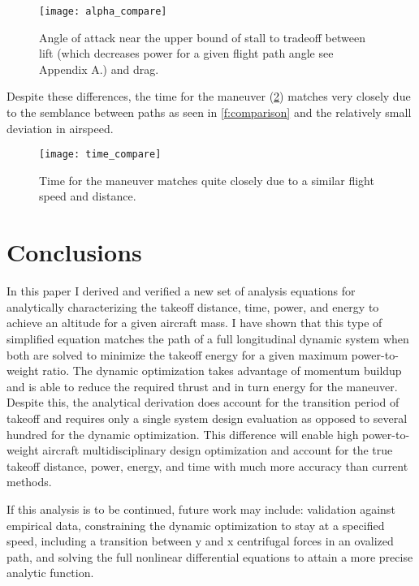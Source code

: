 \documentclass[10pt,english]{article}
\begin{document}
\begin{figure}[H]
\centering
\texttt{[image: alpha\_compare]}
\vspace{-5pt}
\caption{Angle of attack near the upper bound of stall to tradeoff between lift (which decreases power for a given flight path angle see Appendix A.) and drag.}
\label{f:alpha_compare}
\end{figure}

Despite these differences, the time for the maneuver (\cref{f:t_compare}) matches very closely due to the semblance between paths as seen in \cref{f:comparison} and the relatively small deviation in airspeed. 


\begin{figure}[H]
\centering
\texttt{[image: time\_compare]}
\vspace{-5pt}
\caption{Time for the maneuver matches quite closely due to a similar flight speed and distance.}
\label{f:t_compare}
\end{figure}

\section{Conclusions}
In this paper I derived and verified a new set of analysis equations for analytically characterizing the takeoff distance, time, power, and energy to achieve an altitude for a given aircraft mass.  I have shown that this type of simplified equation matches the path of a full longitudinal dynamic system when both are solved to minimize the takeoff energy for a given maximum power-to-weight ratio.  The dynamic optimization takes advantage of momentum buildup and is able to reduce the required thrust and in turn energy for the maneuver.  Despite this, the analytical derivation does account for the transition period of takeoff and requires only a single system design evaluation as opposed to several hundred for the dynamic optimization.  This difference will enable high power-to-weight aircraft multidisciplinary design optimization and account for the true takeoff distance, power, energy, and time with much more accuracy than current methods.  

If this analysis is to be continued, future work may include: validation against empirical data, constraining the dynamic optimization to stay at a specified speed, including a transition between y and x centrifugal forces in an ovalized path, and solving the full nonlinear differential equations to attain a more precise analytic function.
\end{document}
